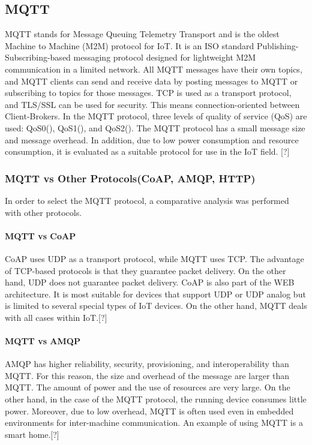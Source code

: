 \documentclass[conference]{IEEEtran}
\begin{document}
\subsection{MQTT}
MQTT stands for Message Queuing Telemetry Transport and is the oldest Machine to Machine (M2M) protocol for IoT. It is an ISO standard Publishing-Subscribing-based messaging protocol designed for lightweight M2M communication in a limited network. All MQTT messages have their own topics, and MQTT clients can send and receive data by posting messages to MQTT  or subscribing to topics for those messages. TCP is used as a transport protocol, and TLS/SSL can be used for security. This means connection-oriented between Client-Brokers. In the MQTT protocol, three levels of quality of service (QoS) are used: QoS0(), QoS1(), and QoS2(). The MQTT protocol has a small message size and message overhead. In addition, due to low power consumption and resource consumption, it is evaluated as a suitable protocol for use in the IoT field.
[?]

\subsubsection{MQTT vs Other Protocols(CoAP, AMQP, HTTP)}
\hfill \break
In order to select the MQTT protocol, a comparative analysis was performed with other protocols.

\paragraph{MQTT vs CoAP}\hfill \break
CoAP uses UDP as a transport protocol, while MQTT uses TCP. The advantage of TCP-based protocols is that they guarantee packet delivery. On the other hand, UDP does not guarantee packet delivery. CoAP is also part of the WEB architecture. It is most suitable for devices that support UDP or UDP analog but is limited to several special types of IoT devices. On the other hand, MQTT deals with all cases within IoT.[?] 

\paragraph{MQTT vs AMQP}
\hfill \break
AMQP has higher reliability, security, provisioning, and interoperability than MQTT. For this reason, the size and overhead of the message are larger than MQTT.
The amount of power and the use of resources are very large. On the other hand, in the case of the MQTT protocol, the running device consumes little power.
Moreover, due to low overhead, MQTT is often used even in embedded environments for inter-machine communication. An example of using MQTT is a smart home.[?]
\end{document}
